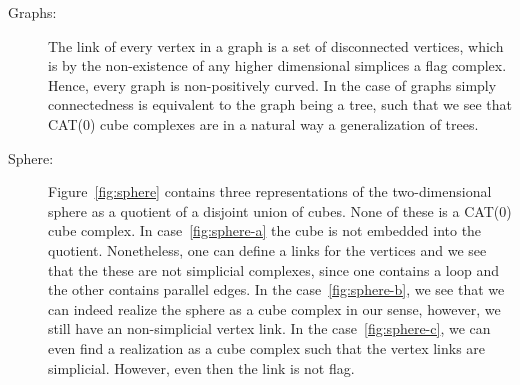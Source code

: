 \begin{bsp}
  \label{bsp:ccc}
  \begin{description}
  \item[Graphs:] The link of every vertex in a graph is a set of disconnected vertices, which is by the non-existence of any higher dimensional simplices a flag complex. Hence, every graph is non-positively curved. In the case of graphs simply connectedness is equivalent to the graph being a tree, such that we see that CAT(0) cube complexes are in a natural way a generalization of trees.
  \item[Sphere:] Figure~\ref{fig:sphere} contains three representations of the two-dimensional sphere as a quotient of a disjoint union of cubes. None of these is a CAT(0) cube complex. In case~\ref{fig:sphere-a} the cube is not embedded  into the quotient. Nonetheless, one can define a links for the vertices and we see that the these are not simplicial complexes, since one contains a loop and the other contains parallel edges. In the case~\ref{fig:sphere-b}, we see that we can indeed realize the sphere as a cube complex in our sense, however, we still have an non-simplicial vertex link. In the case~\ref{fig:sphere-c}, we can even find a realization as a cube complex such that the vertex links are simplicial. However, even then the link is not flag.


\end{description}
\end{bsp}
